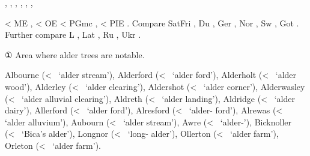 \documentclass[12pt,letterpaper,oneside,article,draft]{memoir}
\begin{document}
\begin{Lemma}
\begin{Also}
	, , , , , , 
\end{Also}
\begin{Etymology}
	< ME ,  < OE  < PGmc ,  < PIE .
	Compare
	SatFri , Du , Ger , Nor , Sw , Got  .
	Further compare
	L , Lat , Ru  , Ukr  .
\end{Etymology}
\begin{Definitions}
	① Area where alder trees are notable.
\end{Definitions}
\begin{Examples}
	Albourne (<~ ‘alder stream’), Alderford (<~ ‘alder ford’), Alderholt (<~ ‘alder wood’), Alderley (<~ ‘alder clearing’), Aldershot (<~ ‘alder corner’), Alderwasley (<~ ‘alder alluvial clearing’), Aldreth (<~ ‘alder landing’), Aldridge (<~ ‘alder dairy’), Allerford (<~ ‘alder ford’), Alresford (<~ ‘alder- ford’), Alrewas (<~ ‘alder alluvium’), Aubourn (<~ ‘alder stream’), Awre (<~ ‘alder-’), Bicknoller (<~ ‘Bica’s alder’), Longnor (<~ ‘long- alder’), Ollerton (<~ ‘alder farm’), Orleton (<~ ‘alder farm’).
\end{Examples}
\end{Lemma}
\end{document}
